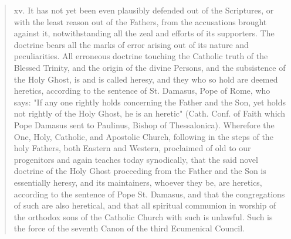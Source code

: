 \begin{quote}
xv. It has not yet been even plausibly defended out of the Scriptures,
or with the least reason out of the Fathers, from the accusations
brought against it, notwithstanding all the zeal and efforts of its
supporters. The doctrine bears all the marks of error arising out of its
nature and peculiarities. All erroneous doctrine touching the Catholic
truth of the Blessed Trinity, and the origin of the divine Persons, and
the subsistence of the Holy Ghost, is and is called heresy, and they who
so hold are deemed heretics, according to the sentence of St. Damasus,
Pope of Rome, who says: "If any one rightly holds concerning the Father
and the Son, yet holds not rightly of the Holy Ghost, he is an heretic"
(Cath. Conf. of Faith which Pope Damasus sent to Paulinus, Bishop of
Thessalonica). Wherefore the One, Holy, Catholic, and Apostolic Church,
following in the steps of the holy Fathers, both Eastern and Western,
proclaimed of old to our progenitors and again teaches today
synodically, that the said novel doctrine of the Holy Ghost proceeding
from the Father and the Son is essentially heresy, and its maintainers,
whoever they be, are heretics, according to the sentence of Pope St.
Damasus, and that the congregations of such are also heretical, and that
all spiritual communion in worship of the orthodox sons of the Catholic
Church with such is unlawful. Such is the force of the seventh Canon of
the third Ecumenical Council.
\end{quote}

